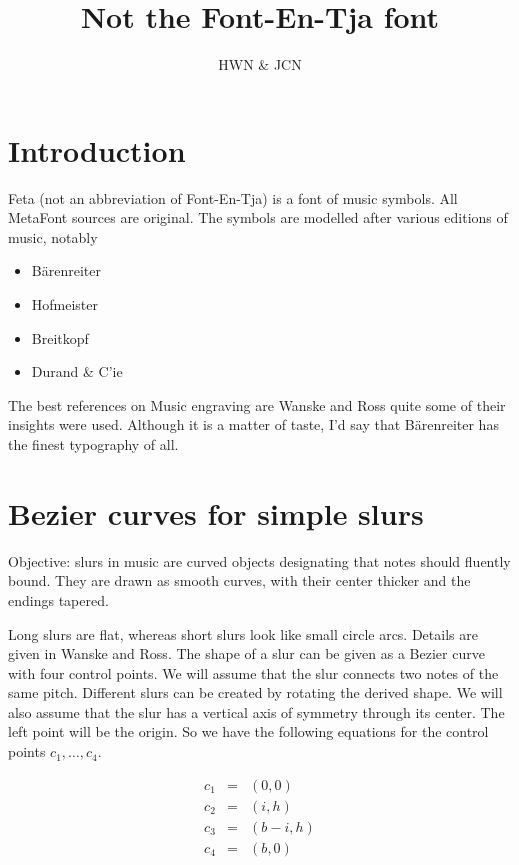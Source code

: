 \documentclass{article}
\title{Not the Font-En-Tja font}
\author{HWN \& JCN}
\def\kdots{,\ldots,}
\begin{document}
\maketitle


\section{Introduction}

Feta (not an abbreviation of Font-En-Tja) is a font of music symbols.
All MetaFont			%
sources are original.  The symbols are modelled after
various editions of music, notably
\begin{itemize}
\item B\"arenreiter
\item Hofmeister
\item Breitkopf
\item Durand \& C'ie
\end{itemize}

The best references on Music engraving are Wanske\cite{wanske} and
Ross\cite{ross} quite some of their insights were used.  Although it
is a matter of taste, I'd say that B\"arenreiter has the finest
typography of all.


\section{Bezier curves for simple slurs}

Objective:  slurs in music are curved objects designating that notes
should fluently bound.  They are drawn as smooth curves, with their
center thicker and the endings tapered.

Long slurs are flat, whereas short slurs look like small circle arcs.
Details are given in Wanske\cite{ross} and Ross\cite{wanske}.  The
shape of a slur can be given as a Bezier curve with four control
points.  We will assume that the slur connects two notes of the same
pitch.  Different slurs can be created by rotating the derived shape.
We will also assume that the slur has a vertical axis of symmetry
through its center.  The left point will be the origin.     So we have
the following equations for the control points $c_1\kdots c_4$.

\begin{eqnarray*}
c_1&=& (0,0)\\
c_2&=& (i, h)\\
c_3&=& (b-i, h)\\
c_4&=& (b, 0)
\end{eqnarray*}
\end{document}
